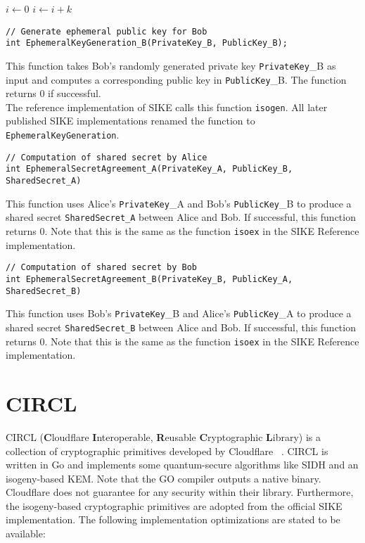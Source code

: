 \begin{algorithmic}
    \State $i\gets 0$
\Else
        \State $i\gets i+k$
    \EndIf
\EndIf
\end{algorithmic}

\begin{lstlisting}[]
// Generate ephemeral public key for Bob
int EphemeralKeyGeneration_B(PrivateKey_B, PublicKey_B);
\end{lstlisting}
This function takes Bob's randomly generated private key \textcolor{keywordcol}{\texttt{PrivateKey}\_B} as input and computes a corresponding public key in \textcolor{keywordcol}{\texttt{PublicKey}\_B}. The function returns 0 if successful.\\
The reference implementation of SIKE calls this function \texttt{isogen}. All later published SIKE implementations renamed the function to \texttt{EphemeralKeyGeneration}.\\

\begin{lstlisting}[]
// Computation of shared secret by Alice
int EphemeralSecretAgreement_A(PrivateKey_A, PublicKey_B, SharedSecret_A)
\end{lstlisting}
This function uses Alice's \textcolor{keywordcol}{\texttt{PrivateKey}\_A} and Bob's \textcolor{keywordcol}{\texttt{PublicKey}\_B} to produce a shared secret \textcolor{keywordcol}{\texttt{SharedSecret\_A}} between Alice and Bob. If successful, this function returns 0. 
Note that this is the same as the function \texttt{isoex} in the SIKE Reference implementation.\\

\begin{lstlisting}[]
// Computation of shared secret by Bob
int EphemeralSecretAgreement_B(PrivateKey_B, PublicKey_A, SharedSecret_B)
\end{lstlisting}
This function uses Bob's \textcolor{keywordcol}{\texttt{PrivateKey}\_B} and Alice's \textcolor{keywordcol}{\texttt{PublicKey}\_A} to produce a shared secret \textcolor{keywordcol}{\texttt{SharedSecret\_B}} between Alice and Bob. If successful, this function returns 0. 
Note that this is the same as the function \texttt{isoex} in the SIKE Reference implementation.


\section{\gls{CIRCL}}

\gls{CIRCL} (\textbf{C}loudflare \textbf{I}nteroperable, \textbf{R}eusable \textbf{C}ryptographic \textbf{L}ibrary) is a collection of cryptographic primitives developed by Cloudflare ~\parencite{circl2020github}. \gls{CIRCL} is written in Go and implements some quantum-secure algorithms like \gls{SIDH} and an isogeny-based \gls{KEM}. Note that the GO compiler outputs a native binary.  Cloudflare does not guarantee for any security within their library. Furthermore, the isogeny-based cryptographic primitives are adopted from the official \gls{SIKE} implementation. The following implementation optimizations are stated to be available:

